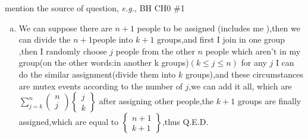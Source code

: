 \documentclass{article}
\begin{document}
\begin{homeworkProblem}{{\color{blue}mention the source of question}, \textit{e.g.}, BH CH0 \#1}
\begin{enumerate}[(a)]
		When considering the last person,there are just two circumstances,since all the other circumstances can't satisfy the request.(it is easy to think that there must be at least $k-1$ groups and no more than $k$ groups when assigning the last person),and these two circumstances are mutex events.(I’m either in a group by myself or I’m not.)
		so we can plus them together,then $\left\{\begin{array}{c}n+1 \\ k\end{array}\right\}=\left\{\begin{array}{c} n \\ k-1\end{array}\right\}+k\left\{\begin{array}{l} n \\ k\end{array}\right\}.$
	
	\item  We can suppose there are $n+1$ people to be assigned (includes me ),then we can divide the $n+1$people into $k+1$ groups,and first I join in one group ,then I randomly choose $j$ people from the other $n$ people which aren't in my group(on the other words:in another k groups)$(k\leq j\leq n)$ for any $j$ I can do the similar assignment(divide them into $k$ groups),and these circumstances are mutex events according to the number of $j$,we can add it all,
which are $\sum_{j=k}^n\left(\begin{array}{l}
	n \\
	j
	\end{array}\right)\left\{\begin{array}{l}
	j \\
	k
	\end{array}\right\}$
	after assigning other people,the $k+1$ groups are finally assigned,which are equal to $\left\{\begin{array}{c} n+1\\ k+1\end{array}\right\}$,thus Q.E.D.
	\end{enumerate}	 
\end{homeworkProblem}
\end{document}
